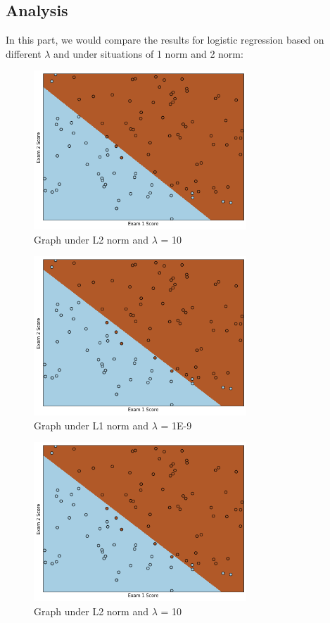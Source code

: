 \documentclass{article}
\begin{document}
	\subsection{Analysis}
	In this part, we would compare the results for logistic regression based on different $\lambda$ and under situations of 1 norm and 2 norm:
		\begin{figure}[H]
			\caption{Graph under L2 norm and $\lambda$ = 10}
			\centering
			\includegraphics[width=8cm]{LinearL2norm10.png}
		\end{figure}
		\begin{figure}[H]
			\caption{Graph under L1 norm and $\lambda$ = 1E-9}
			\centering
			\includegraphics[width=8cm]{LinearL1norm0.png}
		\end{figure}
			\begin{figure}[H]
			\caption{Graph under L2 norm and $\lambda$ = 10}
			\centering
			\includegraphics[width=8cm]{LinearL1norm10.png}
		\end{figure}
		\\
		
\end{document}
